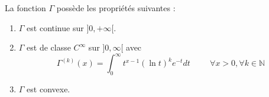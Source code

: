 \begin{theoreme}
    La fonction $\Gamma$ possède les propriétés suivantes :
    \begin{enumerate}
        \item $\Gamma$ est continue sur $]0,+\infty[$.
        \item $\Gamma$ est de classe $C^{\infty}$ sur $]0, \infty[$ avec\\
        \begin{equation*}
            \Gamma^{(k)}(x) = \int_{0}^{\infty} t^{x-1}(\ln t)^k e^{-t} dt \hspace{1cm} \forall x >0, \forall k\in\mathbb{N}
        \end{equation*}
        \item $\Gamma$ est convexe.
    \end{enumerate}
\end{theoreme}
